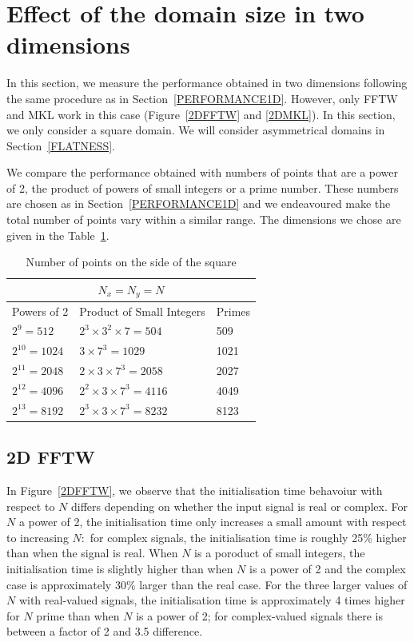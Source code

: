 \documentclass[12pt, a4paper]{article} \setlength{\textheight}{24cm}
\begin{document}
\section{Effect of the domain size in two dimensions}\label{PERFORMANCE2D}

In this section, we measure the performance obtained in two dimensions
following the same procedure as in Section~\ref{PERFORMANCE1D}.
However, only FFTW and MKL work in this case (Figure~\ref{2DFFTW} and
\ref{2DMKL}). In this section, we only consider a square domain. We
will consider asymmetrical domains in Section~\ref{FLATNESS}.

We compare the performance obtained with numbers of points that are a
power of 2, the product of powers of small integers or a prime number.
These numbers are chosen as in Section~\ref{PERFORMANCE1D} and we
endeavoured make the total number of points vary within a similar
range. The dimensions we chose are given in the Table~\ref{SIZES2D}.

\begin{table}[H]
  \captionsetup{width=0.8\linewidth}
  \centering
  \begin{tabular}{|l|l|l|}
    \hline
    \multicolumn{3}{|c|}{$N_x=N_y=N$}\\
    \hline
    \hline
    Powers of 2 & Product of Small Integers & Primes\\ \hline
    $2^9=512$ & $2^3\times 3^2\times 7=504$ & 509\\ \hline
    $2^{10}=1024$ & $3\times 7^3=1029$ & 1021\\ \hline
    $2^{11}=2048$ & $2\times 3\times 7^3=2058$ & 2027\\ \hline
    $2^{12}=4096$ & $2^2\times 3\times 7^3=4116$ & 4049\\ \hline
    $2^{13}=8192$ & $2^3\times 3\times 7^3=8232$ & 8123\\ \hline
  \end{tabular}
  \caption{Number of points on the side of the square}\label{SIZES2D}
\end{table}

\subsection{2D FFTW}
In Figure~\ref{2DFFTW}, we observe that the initialisation time
behavoiur with respect to $N$ differs depending on whether the input
signal is real or complex. For $N$ a power of 2, the initialisation
time only increases a small amount with respect to increasing $N:$ for
complex signals, the initialisation time is roughly 25\% higher than
when the signal is real. When $N$ is a poroduct of small integers, the
initialisation time is slightly higher than when $N$ is a power of 2
and the complex case is approximately 30\% larger than the real case.
For the three larger values of $N$ with real-valued signals, the
initialisation time is approximately 4 times higher for $N$ prime than
when $N$ is a power of 2; for complex-valued signals there is between
a factor of 2 and 3.5 difference.
\end{document}
